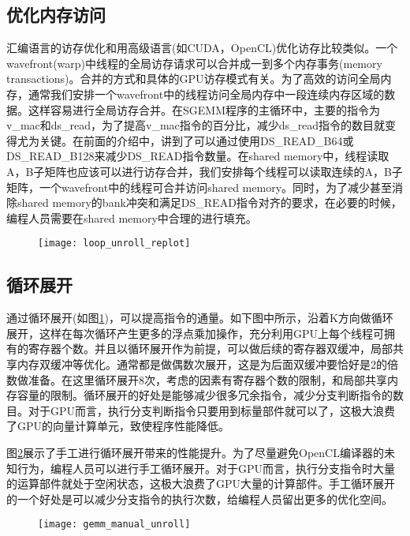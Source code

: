 \subsection{优化内存访问}
汇编语言的访存优化和用高级语言(如CUDA，OpenCL)优化访存比较类似。一个wavefront(warp)中线程的全局访存请求可以合并成一到多个内存事务(memory transactions)。合并的方式和具体的GPU访存模式有关。为了高效的访问全局内存，通常我们安排一个wavefront中的线程访问全局内存中一段连续内存区域的数据。这样容易进行全局访存合并。在SGEMM程序的主循环中，主要的指令为v\_mac和ds\_read，为了提高v\_mac指令的百分比，减少ds\_read指令的数目就变得尤为关键。在前面的介绍中，讲到了可以通过使用DS\_READ\_B64或DS\_READ\_B128来减少DS\_READ指令数量。在shared memory中，线程读取A，B子矩阵也应该可以进行访存合并，我们安排每个线程可以读取连续的A，B子矩阵，一个wavefront中的线程可合并访问shared memory。同时，为了减少甚至消除shared memory的bank冲突和满足DS\_READ指令对齐的要求，在必要的时候，编程人员需要在shared memory中合理的进行填充。

\begin{figure}[htbp]
	\centering
	\texttt{[image: loop\_unroll\_replot]}
	\label{fig:loop_unroll_replot}
\end{figure}
\subsection{循环展开}
通过循环展开(如图\ref{fig:loop_unroll_replot})，可以提高指令的通量。如下图中所示，沿着K方向做循环展开，这样在每次循环产生更多的浮点乘加操作，充分利用GPU上每个线程可拥有的寄存器个数。并且以循环展开作为前提，可以做后续的寄存器双缓冲，局部共享内存双缓冲等优化。通常都是做偶数次展开，这是为后面双缓冲要恰好是2的倍数做准备。在这里循环展开8次，考虑的因素有寄存器个数的限制，和局部共享内存容量的限制。循环展开的好处是能够减少很多冗余指令，减少分支判断指令的数目。对于GPU而言，执行分支判断指令只要用到标量部件就可以了，这极大浪费了GPU的向量计算单元，致使程序性能降低。

图\ref{fig:gemm_manual_unroll}展示了手工进行循环展开带来的性能提升。为了尽量避免OpenCL编译器的未知行为，编程人员可以进行手工循环展开。对于GPU而言，执行分支指令时大量的运算部件就处于空闲状态，这极大浪费了GPU大量的计算部件。手工循环展开的一个好处是可以减少分支指令的执行次数，给编程人员留出更多的优化空间。
\begin{figure}[htbp]
	\centering
	\texttt{[image: gemm\_manual\_unroll]}
	\label{fig:gemm_manual_unroll}
\end{figure}
